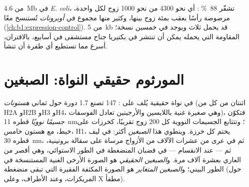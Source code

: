 \begin{example}\label{ex:b1:genomes:dense}
من \qty{4.6}{Mb} في  \emph{E. coli}، تشفّر \qty{88}{\%}
: أي نحو \num{4300}  من نحو \num{1000} زوج لكل واحدة،
مرصوصة رأسًا بعقب بمئة زوج بينها، وكثير منها مجموع في
\emph{أوبرونات} تُستنسخ معًا (\cref{ch:b1:expression-control}).
 من \qty{5}{kb} قد يحمل ثلاث  ويوجد في خمسين نسخة؛
 المقاومة التي يحمله يمكن أن تنتشر في بكتيريا جناح مستشفى في
أسابيع، بالاقتران، أسرع مما تستطيع أي طفرة أن تنشأ.
\end{example}

\section{المورثوم حقيقي النواة: الصبغين}

\begin{definition}\label{def:b1:genomes:nucleosome}
في نواة حقيقية يُلف  على : \qty{147}{}  تصنع 1.7
دورة حول ثماني \emph{هستونات} (اثنتان من كل من H2A وH2B وH3 وH4، وهي
 صغيرة غنية باللايسين والأرجينين تعادل الفوسفات)، فتكوّن
\emph{جسيمًا نوويًا} قطره \qty{11}{nm}؛ وتتتابع
الجسيمات النووية كل \qty{200}{} زوج تقريبًا، كخرزات على خيط، مع
هستون خامس، H1، يختم كل خرزة. وينطوي هذا \emph{الصبغين} أكثر: في ليف
قطره \qty{30}{nm}، ثم في عرى من عشرات الآلاف من الأزواج مرساة على
سقالة بروتينية، ثم --- عند الانقسام --- في قضبان  المنضغطة في
الطور الاستوائي، وهي أقصر من  العاري بعشرة آلاف مرة.
و\emph{الصبغين الحقيقي} هو الصورة الأرخى الغنية  المستنسخة
في الطور البيني؛ و\emph{الصبغين المتغاير} هو الصورة المكثفة الفقيرة
 التي تبقى منضغطة (حول المريكزات، وعند الأطراف، وعلى 
X مطفأ).
\end{definition}

